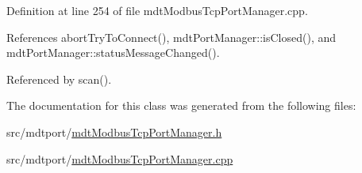 Definition at line 254 of file mdt\-Modbus\-Tcp\-Port\-Manager.\-cpp.



References abort\-Try\-To\-Connect(), mdt\-Port\-Manager\-::is\-Closed(), and mdt\-Port\-Manager\-::status\-Message\-Changed().



Referenced by scan().



The documentation for this class was generated from the following files\-:\begin{DoxyCompactItemize}
\item 
src/mdtport/\hyperlink{mdt_modbus_tcp_port_manager_8h}{mdt\-Modbus\-Tcp\-Port\-Manager.\-h}\item 
src/mdtport/\hyperlink{mdt_modbus_tcp_port_manager_8cpp}{mdt\-Modbus\-Tcp\-Port\-Manager.\-cpp}\end{DoxyCompactItemize}

